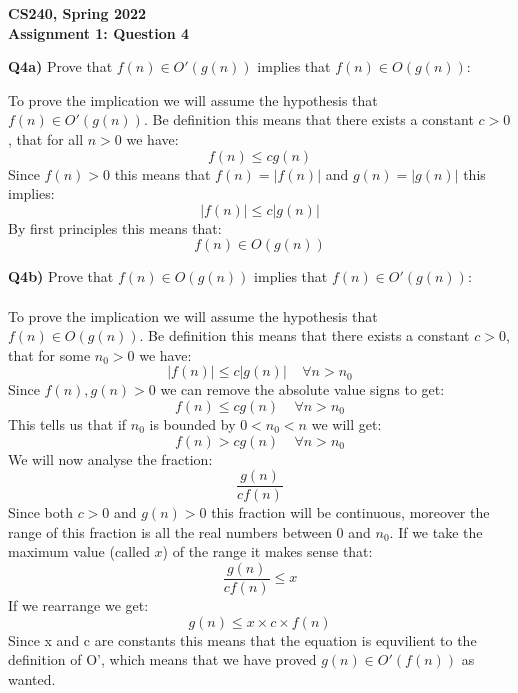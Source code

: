 \documentclass[12pt]{article}
\begin{document}
\begin{center}
{\Large\textbf{CS240, Spring 2022}}\\
\vspace{2mm}
{\Large\textbf{Assignment 1: Question 4}}\\
\vspace{3mm}
\end{center}
\[ \]
\textbf{Q4a)} Prove that $f(n) \in O'(g(n))$ implies that $f(n) \in O(g(n))$:\\ 
\begin{adjustwidth}{0em}{0pt}
To prove the implication we will assume the hypothesis that $f(n) \in O'(g(n))$. Be definition this means that there exists a constant $c > 0$, that for all $n>0$ we have:
\[ f(n) \leq cg(n) \]
Since $f(n) > 0$ this means that $f(n) = |f(n)|$ and $g(n) = |g(n)|$ this implies:
\[ |f(n)| \leq c|g(n)| \]
By first principles this means that:
\[ f(n) \in O(g(n)) \]
\end{adjustwidth}

\begin{adjustwidth}{0em}{0pt}
\textbf{Q4b)} Prove that $f(n) \in O(g(n))$ implies that $f(n) \in O'(g(n))$:\\ \\
To prove the implication we will assume the hypothesis that $f(n) \in O(g(n))$. Be definition this means that there exists a constant $c > 0$, that for some $n_0>0$ we have:
\[ |f(n)| \leq c|g(n)| \ \ \ \ \ \forall n > n_0\]
Since $f(n), g(n) > 0$ we can remove the absolute value signs to get:
\[ f(n) \leq cg(n) \ \ \ \ \ \forall n > n_0\]
This tells us that if $n_0$ is bounded by $0 < n_0 < n$ we will get:
\[ f(n) > cg(n) \ \ \ \ \ \forall n > n_0\]
We will now analyse the fraction:
\[ \frac{g(n)}{cf(n)} \]
Since both $c>0$ and $g(n)>0$ this fraction will be continuous, moreover the range of this fraction is all the real numbers between $0$ and $n_0$. If we take the maximum value (called $x$) of the range it makes sense that:
\[ \frac{g(n)}{cf(n)} \leq x \]
If we rearrange we get: 
\[ g(n) \leq x\times{c}\times{f(n)} \]
Since x and c are constants this means that the equation is equvilient to the definition of O', which means that we have proved $g(n) \in O'(f(n))$ as wanted.
\end{adjustwidth}
\end{document}
